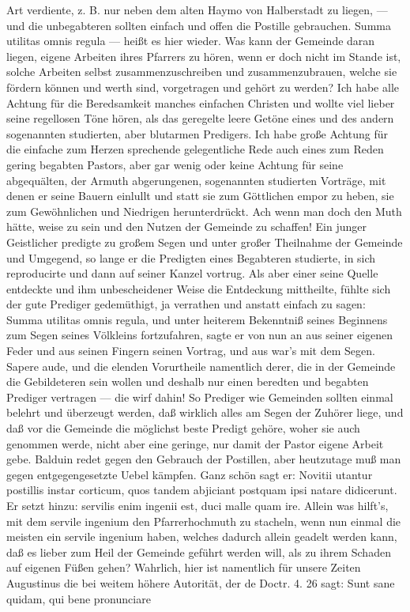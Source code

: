 Art verdiente, z. B. nur neben dem alten Haymo von Halberstadt zu liegen, — und die unbegabteren sollten einfach und offen die Postille gebrauchen. Summa utilitas omnis regula — heißt es hier wieder. Was kann der Gemeinde daran liegen, eigene Arbeiten ihres Pfarrers zu hören, wenn er doch nicht im Stande ist, solche Arbeiten selbst zusammenzuschreiben und zusammenzubrauen, welche sie fördern können und werth sind, vorgetragen und gehört zu werden? Ich habe alle Achtung für die Beredsamkeit manches einfachen Christen und wollte viel lieber seine regellosen Töne hören, als das geregelte leere Getöne eines und des andern sogenannten studierten, aber blutarmen Predigers. Ich habe große Achtung für die einfache zum Herzen sprechende gelegentliche Rede auch eines zum Reden gering begabten Pastors, aber gar wenig oder keine Achtung für seine abgequälten, der Armuth abgerungenen, sogenannten studierten Vorträge, mit denen er seine Bauern einlullt und statt sie zum Göttlichen empor zu heben, sie zum Gewöhnlichen und Niedrigen herunterdrückt. Ach wenn man doch den Muth hätte, weise zu sein und den Nutzen der Gemeinde zu schaffen! Ein junger Geistlicher predigte zu großem Segen und unter großer Theilnahme der Gemeinde und Umgegend, so lange er die Predigten eines Begabteren studierte, in sich reproducirte und dann auf seiner Kanzel vortrug. Als aber
einer seine Quelle entdeckte und ihm unbescheidener Weise die Entdeckung mittheilte, fühlte sich der gute Prediger gedemüthigt, ja verrathen und anstatt einfach zu sagen: Summa utilitas omnis regula, und unter heiterem Bekenntniß seines Beginnens zum Segen seines Völkleins fortzufahren, sagte er von nun an aus seiner eigenen Feder und aus seinen Fingern seinen Vortrag, und aus war’s mit dem Segen. Sapere aude, und die elenden Vorurtheile namentlich derer, die in der Gemeinde die Gebildeteren sein wollen und deshalb nur einen beredten und begabten Prediger vertragen — die wirf dahin! So Prediger wie Gemeinden sollten einmal belehrt und überzeugt werden, daß wirklich alles am Segen der Zuhörer liege, und daß vor die Gemeinde die möglichst beste Predigt gehöre, woher sie auch genommen werde, nicht aber eine geringe, nur damit der Pastor eigene Arbeit gebe. Balduin redet gegen den Gebrauch der Postillen, aber heutzutage muß man gegen entgegengesetzte Uebel kämpfen. Ganz schön sagt er: Novitii utantur postillis instar corticum, quos tandem abjiciant postquam ipsi natare didicerunt. Er setzt hinzu: servilis enim ingenii est, duci malle quam ire. Allein was hilft’s, mit dem servile ingenium den Pfarrerhochmuth zu stacheln, wenn nun einmal die meisten ein servile ingenium haben, welches dadurch allein geadelt werden kann, daß es lieber zum Heil der Gemeinde geführt werden will, als zu ihrem Schaden auf eigenen Füßen gehen? Wahrlich, hier ist namentlich für unsere Zeiten Augustinus die bei weitem höhere Autorität, der de Doctr. 4. 26 sagt: Sunt sane quidam, qui bene pronunciare
